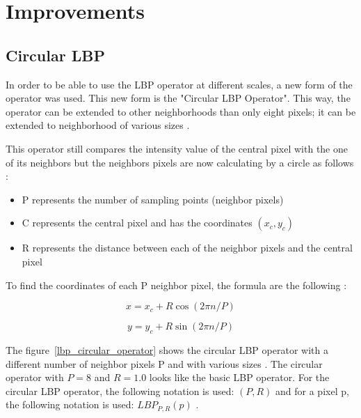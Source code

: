 \section{Improvements}

\subsection{Circular LBP}

\vspace{\baselineskip}
\noindent In order to be able to use the LBP operator at different scales, a new form of the operator was used. This new form is the "Circular LBP Operator". This way, the operator can be extended to other neighborhoods than only eight pixels; it can be extended to neighborhood of various sizes \cite{GAN08}.
\newline

\noindent This operator still compares the intensity value of the central pixel with the one of its neighbors but the neighbors pixels are now calculating by a circle as follows \cite{GAN08}:

\begin{itemize}
  \item P represents the number of sampling points (neighbor pixels)
  \item C represents the central pixel and has the coordinates $ (x_c,y_c) $
  \item R represents the distance between each of the neighbor pixels and the central pixel
\end{itemize}

\noindent To find the coordinates of each P neighbor pixel, the formula are the following \cite{JUL07}:
\newline

\begin{equation}
   x = x_c + R\cos(2\pi n/P)
\end{equation}

\begin{equation}
   y = y_c + R\sin(2\pi n/P)
\end{equation}

\vspace{\baselineskip}
\noindent The figure~\ref{lbp_circular_operator} shows the circular LBP operator with a different number of neighbor pixels P and with various sizes \cite{JUL07}. The circular operator with $ P = 8 $ and $ R = 1.0 $ looks like the basic LBP operator. For the circular LBP operator, the following notation is used: $ (P,R) $ and for a pixel p, the following notation is used: $ LBP_{P,R}(p) $ \cite{GAN08}.
\newline

